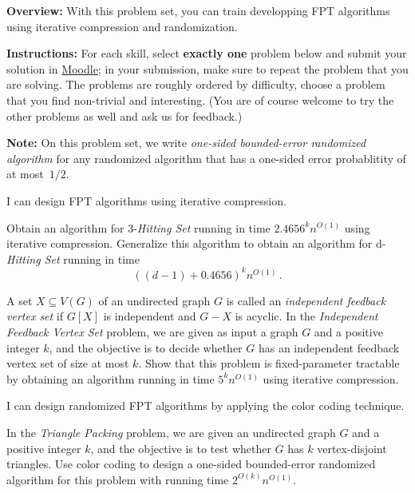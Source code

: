\documentclass[english]{uebung_cs}
\begin{document}
\textbf{Overview:} With this problem set, you can train developping FPT algorithms using iterative compression and randomization.

\textbf{Instructions:} For each skill, select \textbf{exactly one} problem below and submit your solution in \href{https://moodle.studiumdigitale.uni-frankfurt.de/moodle/course/view.php?id=6259}{Moodle}; in your submission, make sure to repeat the problem that you are solving.
The problems are roughly ordered by difficulty, choose a problem that you find non-trivial and interesting. (You are of course welcome to try the other problems as well and ask us for feedback.)

\textbf{Note:} On this problem set, we write \emph{one-sided bounded-error randomized algorithm} for any randomized algorithm that has a one-sided error probablitity of at most~$1/2$.

\begin{skill}
  I can design FPT algorithms using iterative compression.
\end{skill}

\begin{exercise}
Obtain an algorithm for 3-\emph{Hitting Set} running in time $2.4656^kn^{O(1)}$ using iterative compression. Generalize this algorithm to obtain an algorithm for d-\emph{Hitting Set} running in time \[((d-1)+0.4656)^kn^{O(1)} \,. \]
\end{exercise}

\begin{exercise}
  A set $X \subseteq V(G)$ of an undirected graph $G$ is called an \emph{independent feedback vertex set} if $G[X]$ is independent and $G - X$ is acyclic. In the \emph{Independent Feedback Vertex Set} problem, we are given as input a graph $G$ and a positive integer $k$, and the objective is to decide whether $G$ has an independent feedback vertex set of size at most $k$. Show that this problem is fixed-parameter tractable by obtaining an algorithm running in time $5^kn^{O(1)}$ using iterative compression.
\end{exercise}

\begin{skill}
  I can design randomized FPT algorithms by applying the color coding technique.
\end{skill}

\begin{exercise}
In the \emph{Triangle Packing} problem, we are given an undirected graph $G$ and a positive integer $k$, and the objective is to test whether $G$ has $k$ vertex-disjoint triangles. Use color coding to design a one-sided bounded-error randomized algorithm for this problem with running time $2^{O(k)} n^{O(1)}$.
\end{exercise}
\end{document}
